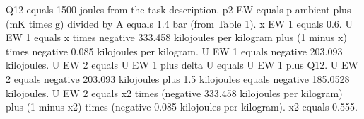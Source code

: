 Q12 equals 1500 joules from the task description.  
p2 EW equals p ambient plus (mK times g) divided by A equals 1.4 bar (from Table 1).  
x EW 1 equals 0.6.  
U EW 1 equals x times negative 333.458 kilojoules per kilogram plus (1 minus x) times negative 0.085 kilojoules per kilogram.  
U EW 1 equals negative 203.093 kilojoules.  
U EW 2 equals U EW 1 plus delta U equals U EW 1 plus Q12.  
U EW 2 equals negative 203.093 kilojoules plus 1.5 kilojoules equals negative 185.0528 kilojoules.  
U EW 2 equals x2 times (negative 333.458 kilojoules per kilogram) plus (1 minus x2) times (negative 0.085 kilojoules per kilogram).  
x2 equals 0.555.